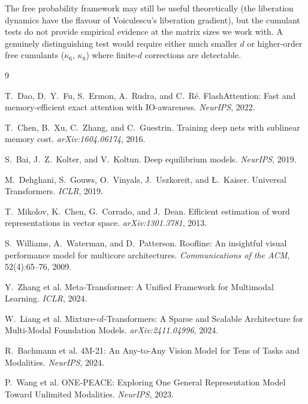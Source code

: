 \documentclass[11pt, a4paper]{article}
\theoremstyle{remark}
\begin{document}
The free probability framework may still be useful theoretically (the liberation dynamics have the flavour of Voiculescu's liberation gradient), but the cumulant tests do not provide empirical evidence at the matrix sizes we work with.
A genuinely distinguishing test would require either much smaller $d$ or higher-order free cumulants ($\kappa_6$, $\kappa_8$) where finite-$d$ corrections are detectable.


\begin{thebibliography}{9}

T.~Dao, D.~Y.~Fu, S.~Ermon, A.~Rudra, and C.~R\'{e}.
\newblock FlashAttention: Fast and memory-efficient exact attention with IO-awareness.
\newblock \emph{NeurIPS}, 2022.

T.~Chen, B.~Xu, C.~Zhang, and C.~Guestrin.
\newblock Training deep nets with sublinear memory cost.
\newblock \emph{arXiv:1604.06174}, 2016.

S.~Bai, J.~Z.~Kolter, and V.~Koltun.
\newblock Deep equilibrium models.
\newblock \emph{NeurIPS}, 2019.

M.~Dehghani, S.~Gouws, O.~Vinyals, J.~Uszkoreit, and \L.~Kaiser.
\newblock Universal Transformers.
\newblock \emph{ICLR}, 2019.

T.~Mikolov, K.~Chen, G.~Corrado, and J.~Dean.
\newblock Efficient estimation of word representations in vector space.
\newblock \emph{arXiv:1301.3781}, 2013.

S.~Williams, A.~Waterman, and D.~Patterson.
\newblock Roofline: An insightful visual performance model for multicore architectures.
\newblock \emph{Communications of the ACM}, 52(4):65--76, 2009.

Y.~Zhang et al.
\newblock Meta-Transformer: A Unified Framework for Multimodal Learning.
\newblock \emph{ICLR}, 2024.

W.~Liang et al.
\newblock Mixture-of-Transformers: A Sparse and Scalable Architecture for Multi-Modal Foundation Models.
\newblock \emph{arXiv:2411.04996}, 2024.

R.~Bachmann et al.
\newblock 4M-21: An Any-to-Any Vision Model for Tens of Tasks and Modalities.
\newblock \emph{NeurIPS}, 2024.

P.~Wang et al.
\newblock ONE-PEACE: Exploring One General Representation Model Toward Unlimited Modalities.
\newblock \emph{NeurIPS}, 2023.


\end{thebibliography}
\end{document}
